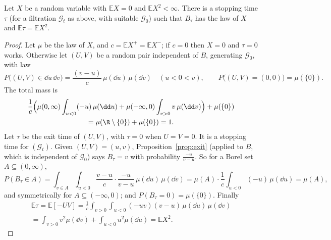 \begin{theorem}\label{thm:skorokhod}
Let $X$ be a random variable with $\mathbb E X=0$ and $\mathbb E X^2<\infty$. There is a stopping time $\tau$ (for a filtration $\mathcal G_t$ as above, with suitable
$\mathcal G_0$) such that $B_\tau$ has the law of $X$ and $\mathbb E\tau=\mathbb E X^2$.
\end{theorem}
\begin{proof}
Let $\mu$ be the law of $X$, and $c=\mathbb E X^+=\mathbb E X^-$; if $c=0$ then $X=0$ and $\tau=0$ works. Otherwise let $(U,V)$ be a random pair independent of $B$, generating
$\mathcal G_0$, with law
\[
P\bigl((U,V)\in\dd u\,\dd v\bigr)=\frac{(v-u)}c\,\mu(\dd u)\,\mu(\dd v)\quad(u<0<v),\qquad P\bigl((U,V)=(0,0)\bigr)=\mu(\{0\}).
\]
The total mass is
\[
\begin{gathered}
\frac1c\Bigl(\mu(0,\infty)\int_{u<0}(-u)\,\mu(\dd u)+\mu(-\infty,0)\int_{v>0}v\,\mu(\dd v)\Bigr)+\mu(\{0\})\\
=\mu(\R\setminus\{0\})+\mu(\{0\})=1.
\end{gathered}
\]
Let $\tau$
be the exit time of $(U,V)$, with $\tau=0$ when $U=V=0$. It is a stopping time for $(\mathcal G_t)$. Given $(U,V)=(u,v)$, Proposition~\ref{prop:exit} (applied to $B$, which is
independent of $\mathcal G_0$) says $B_\tau=v$ with probability $\frac{-u}{v-u}$. So for a Borel set $A\subseteq(0,\infty)$,
\[
P(B_\tau\in A)=\int_{v\in A}\int_{u<0}\frac{v-u}c\cdot\frac{-u}{v-u}\,\mu(\dd u)\,\mu(\dd v)=\mu(A)\cdot\frac1c\int_{u<0}(-u)\,\mu(\dd u)=\mu(A),
\]
and symmetrically for $A\subseteq(-\infty,0)$; and $P(B_\tau=0)=\mu(\{0\})$. Finally
\[
\begin{gathered}
\mathbb E\tau=\mathbb E[-UV]=\frac1c\int_{v>0}\int_{u<0}(-uv)(v-u)\,\mu(\dd u)\,\mu(\dd v)\\=\int_{v>0}v^2\mu(\dd v)+\int_{u<0}u^2\mu(\dd u)=\mathbb E X^2.
\end{gathered}
\]
\end{proof}

